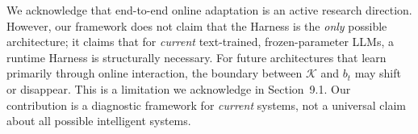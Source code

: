 We acknowledge that end-to-end online adaptation is an active research direction. However, our framework does not claim that the Harness is the \emph{only} possible architecture; it claims that for \emph{current} text-trained, frozen-parameter LLMs, a runtime Harness is structurally necessary. For future architectures that learn primarily through online interaction, the boundary between \(\mathcal{K}\) and \(b_t\) may shift or disappear. This is a limitation we acknowledge in Section~9.1. Our contribution is a diagnostic framework for \emph{current} systems, not a universal claim about all possible intelligent systems.
